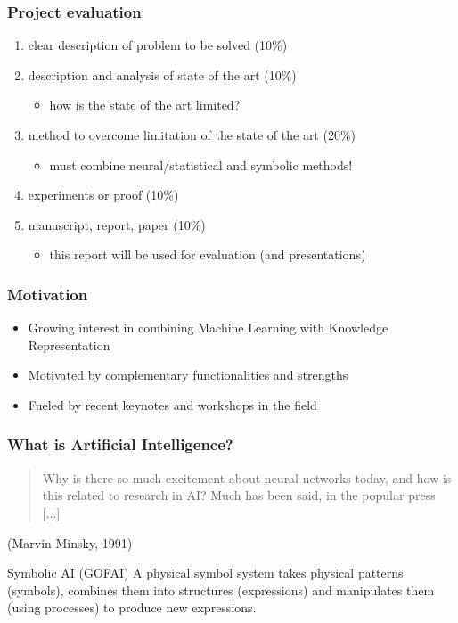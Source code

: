 \documentclass{beamer}
\begin{document}
\begin{frame}
  \frametitle{Project evaluation}
  \begin{enumerate}
  \item clear description of problem to be solved (10\%)
  \item description and analysis of state of the art (10\%)
    \begin{itemize}
    \item how is the state of the art limited?
    \end{itemize}
  \item method to overcome limitation of the state of the art (20\%)
    \begin{itemize}
    \item must combine neural/statistical and symbolic methods!
    \end{itemize}
  \item experiments or proof (10\%)
  \item manuscript, report, paper (10\%)
    \begin{itemize}
    \item this report will be used for evaluation (and presentations)
    \end{itemize}
  \end{enumerate}
\end{frame}

\begin{frame}
\frametitle{Motivation}
\begin{itemize}
\item Growing interest in combining Machine Learning with Knowledge
  Representation
\item Motivated by complementary functionalities and strengths
\item Fueled by recent keynotes and workshops in the field
\end{itemize}
\end{frame}

\begin{frame}
  \frametitle{What is Artificial Intelligence?}
  \begin{quote}
    Why is there so much excitement about neural networks today, and
    how is this related to research in AI? Much has been said, in
    the popular press [...]
  \end{quote}
  \pause
  (Marvin Minsky, 1991)
  \pause
  \begin{block}{Symbolic AI (GOFAI)}
    A physical symbol system takes physical patterns (symbols),
    combines them into structures (expressions) and manipulates them
    (using processes) to produce new expressions.
  \end{block}
\end{frame}
\end{document}
